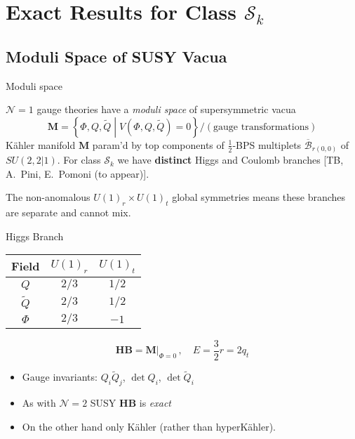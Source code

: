 \documentclass{beamer}
\begin{document}
\section{Exact Results for Class $\mathcal{S}_k$}
\subsection{Moduli Space of SUSY Vacua}
\begin{frame}{Moduli space}
\begin{block}{$\mathcal{N}=1$ gauge theories have a \textit{moduli space} of supersymmetric vacua}
   \begin{equation}
       \mathbf{M}=\left\{\Phi,Q,\widetilde{Q}\middle|V(\Phi,Q,\widetilde{Q})=0\right\}/(\text{gauge transformations})
   \end{equation}
K\"ahler manifold $\mathbf{M}$ param'd by top components of $\frac{1}{2}$-BPS multiplets $\overline{\mathcal{B}}_{r(0,0)}$ of $SU(2,2|1)$.\newline 
   For class $\mathcal{S}_k$ we have \textbf{distinct} Higgs and Coulomb branches \color{blue}[TB, A.~Pini, E.~Pomoni (to appear)]\color{black}. 
   \begin{center}
   \end{center}
\end{block}
The non-anomalous $U(1)_r\times U(1)_t$ global symmetries means these branches are separate and cannot mix.
\end{frame}
\begin{frame}{Higgs Branch}
\begin{center}
\begin{tabular}{c|c|c}
Field&$U(1)_r$&$U(1)_t$\\\hline
     $Q$&$2/3$&$1/2$  \\
     $\widetilde{Q}$&$2/3$&$1/2$\\
     $\Phi$&$2/3$&$-1$
\end{tabular}
\end{center}
   \begin{equation*}
 \boxed{\mathbf{HB}=\mathbf{M}|_{\Phi=0}\,,\quad E=\frac{3}{2}r=2q_t}
   \end{equation*}
   \begin{itemize}
    \item Gauge invariants: $Q_i\widetilde{Q}_j$, $\det Q_i$, $\det\widetilde{Q}_i$
       \item  As with $\mathcal{N}=2$ SUSY $\mathbf{HB}$ is \textit{exact}
       \item On the other hand only K\"ahler (rather than hyperK\"ahler).
   \end{itemize}
\end{frame}
\end{document}
